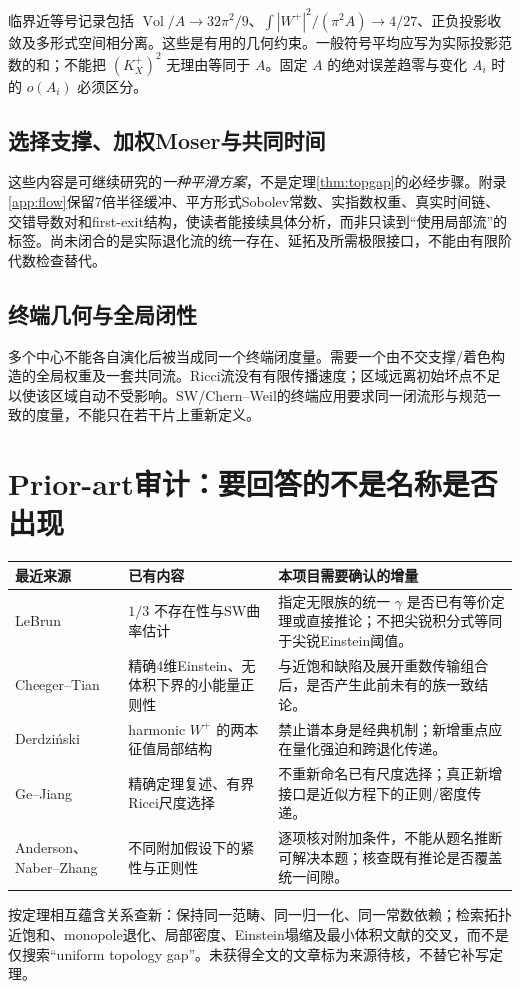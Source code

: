 \documentclass[UTF8,a4paper,11pt,fontset=fandol]{ctexart}
\numberwithin{equation}{section}
\theoremstyle{definition}
\newcommand{\Vol}{\operatorname{Vol}}
\begin{document}
临界近等号记录包括 $\Vol/A\to32\pi^2/9$、$\int|W^+|^2/(\pi^2A)\to4/27$、正负投影收敛及多形式空间相分离。这些是有用的几何约束。一般符号平均应写为实际投影范数的和；不能把 $(K_X^+)^2$ 无理由等同于 $A$。固定 $A$ 的绝对误差趋零与变化 $A_i$ 时的 $o(A_i)$ 必须区分。

\subsection{选择支撑、加权Moser与共同时间}
这些内容是可继续研究的\emph{一种平滑方案}，不是定理\ref{thm:topgap}的必经步骤。附录\ref{app:flow}保留7倍半径缓冲、平方形式Sobolev常数、实指数权重、真实时间链、交错导数对和first-exit结构，使读者能接续具体分析，而非只读到“使用局部流”的标签。尚未闭合的是实际退化流的统一存在、延拓及所需极限接口，不能由有限阶代数检查替代。

\subsection{终端几何与全局闭性}
多个中心不能各自演化后被当成同一个终端闭度量。需要一个由不交支撑/着色构造的全局权重及一套共同流。Ricci流没有有限传播速度；区域远离初始坏点不足以使该区域自动不受影响。SW/Chern--Weil的终端应用要求同一闭流形与规范一致的度量，不能只在若干片上重新定义。

\section{Prior-art审计：要回答的不是名称是否出现}
\begin{longtable}{L{.23\textwidth}L{.33\textwidth}L{.35\textwidth}}
\toprule 最近来源 & 已有内容 & 本项目需要确认的增量\\\midrule\endhead
LeBrun\cite{LeBrun2001} & $1/3$ 不存在性与SW曲率估计 & 指定无限族的统一 $\gamma$ 是否已有等价定理或直接推论；不把尖锐积分式等同于尖锐Einstein阈值。\\
Cheeger--Tian\cite{CT2006} & 精确4维Einstein、无体积下界的小能量正则性 & 与近饱和缺陷及展开重数传输组合后，是否产生此前未有的族一致结论。\\
Derdzi\'nski\cite{Derdzinski} & harmonic $W^+$ 的两本征值局部结构 & 禁止谱本身是经典机制；新增重点应在量化强迫和跨退化传递。\\
Ge--Jiang\cite{GJ2017} & 精确定理复述、有界Ricci尺度选择 & 不重新命名已有尺度选择；真正新增接口是近似方程下的正则/密度传递。\\
Anderson、Naber--Zhang\cite{Anderson1989,NZ} & 不同附加假设下的紧性与正则性 & 逐项核对附加条件，不能从题名推断可解决本题；核查既有推论是否覆盖统一间隙。\\\bottomrule
\end{longtable}
按定理相互蕴含关系查新：保持同一范畴、同一归一化、同一常数依赖；检索拓扑近饱和、monopole退化、局部密度、Einstein塌缩及最小体积文献的交叉，而不是仅搜索“uniform topology gap”。未获得全文的文章标为来源待核，不替它补写定理。
\end{document}
